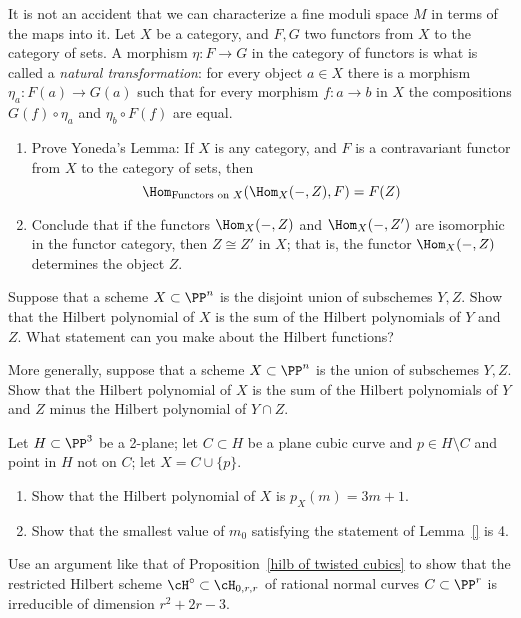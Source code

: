 \begin{exercise}
It is not an accident that we can characterize a fine moduli space $M$ in terms of the maps into it. 
 Let $X$ be a category, and $F,G$ two functors from $X$ to the category of sets.
 A morphism $\eta: F\to G$ in the category of functors is what is called a \emph{natural transformation}:
 for every object $a\in X$ there is a morphism $\eta_a:F(a) \to G(a)$ such that for every
 morphism $f: a\to b$ in $X$ the compositions $G(f)\circ \eta_a$ and $\eta_b\circ F(f)$
 are equal. 
\begin{enumerate}
 \item Prove Yoneda's Lemma: If $X$ is any category, and $F$ is a contravariant functor from $X$ to the category of sets, then 
 $$
 \Hom_{\hbox{\scriptsize Functors on $X$}}(\Hom_X( -, Z), F) = F(Z)
 $$
 \item Conclude that if the functors $\Hom_X( -, Z)$ and $\Hom_X( -, Z')$ are isomorphic in the functor category, 
 then $Z \cong Z'$ in $X$; that is, the functor $\Hom_X( -, Z)$ determines the object $Z$.
 \end{enumerate}
\end{exercise}

\begin{exercise}\label{deg of disjoint union}
Suppose that a scheme $X\subset \PP^n$ is the disjoint union of subschemes $Y,Z$. Show that the Hilbert polynomial of
$X$ is the sum of the Hilbert polynomials of $Y$ and $Z$. What statement can you make about the Hilbert functions?
\end{exercise}

\begin{exercise}
More generally, suppose that a scheme $X\subset \PP^n$ is the union of subschemes $Y,Z$. Show that the Hilbert polynomial of
$X$ is the sum of the Hilbert polynomials of $Y$ and $Z$ minus the Hilbert polynomial of $Y\cap Z$. 
\end{exercise}


\begin{exercise}
Let $H \subset \PP^3$ be a 2-plane; let $C \subset H$ be a plane cubic curve and $p \in H \setminus C$ and point in $H$ not on $C$; let $X = C \cup \{p\}$.
\begin{enumerate}
\item Show that the Hilbert polynomial of $X$ is $p_X(m) = 3m+1$.
\item Show that the smallest value of $m_0$ satisfying the statement of Lemma~\ref{} is 4.
\end{enumerate}
\end{exercise}

\begin{exercise}\label{rational normal hilbert}
Use an  argument like that of Proposition~\ref{hilb of twisted cubics} to show that the restricted Hilbert scheme $\cH^\circ \subset \cH_{0,r,r}$ of rational normal curves $C \subset \PP^r$ is irreducible of dimension $r^2+2r-3$.
\end{exercise}



